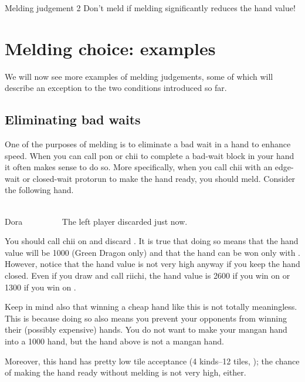 \bigskip
\color{MyRed}
\begin{itembox}[c]{Melding judgement 2}\normalcolor
Don't meld if melding significantly reduces the hand value!
\end{itembox}\normalcolor

\newpage
\section{Melding choice: examples}
We will now see more examples of melding judgements, some of which will describe an exception to the two conditions introduced so far. 

\bigskip
\subsection{Eliminating bad waits}
One of the purposes of melding is to eliminate a bad wait in a hand to enhance speed. When you can call {\jap pon} or {\jap chii} to complete a bad-wait block in your hand it often makes sense to do so. More specifically, when you call {\jap chii} with an edge-wait or closed-wait protorun to make the hand ready, you should meld. Consider the following hand.

\bigskip
\begin{screen}
\bp
{}\fa\fa~~\xi\\
\hfill\footnotesize{{\jap Dora}~~~~~~~~~}
\ep
\vspace{-15pt}The left player discarded {\LARGE{}} just now.
\end{screen}

\bigskip
You should call {\jap chii} on {\LARGE{}} and discard {\LARGE{}}. It is true that doing so means that the hand value will be 1000 (Green Dragon only) and that the hand can be won only with {\LARGE\fa}. However, notice that the hand value is not very high anyway if you keep the hand closed. Even if you draw {\LARGE{}} and call riichi, the hand value is 2600 if you win on {\LARGE\fa} or 1300 if you win on {\LARGE{}}. 

\bigskip
Keep in mind also that winning a cheap hand like this is not totally meaningless.  This is because doing so also means you prevent your opponents from winning their (possibly expensive) hands. You do not want to make your {\jap mangan} hand into a 1000 hand, but the hand above is not a {\jap mangan} hand.

\bigskip
Moreover, this hand has pretty low tile acceptance (4 kinds--12 tiles, {\LARGE{}\fa}); the chance of making the hand ready without melding is not very high, either. 

